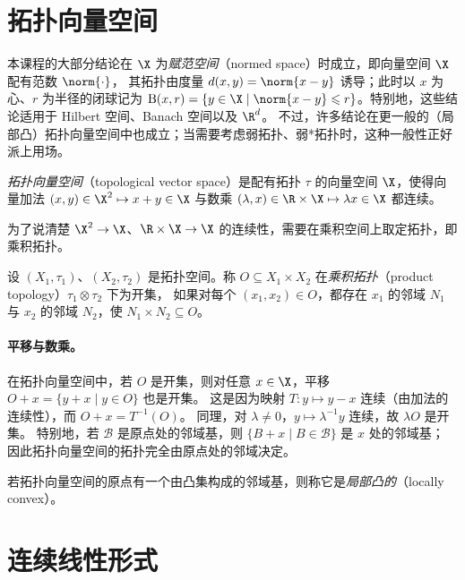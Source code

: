 \section{拓扑向量空间}

本课程的大部分结论在 $\X$ 为\emph{赋范空间}（normed space）时成立，即向量空间 $\X$ 配有范数 $\norm{\cdot}$，
其拓扑由度量 $d(x,y)=\norm{x-y}$ 诱导；此时以 $x$ 为心、$r$ 为半径的闭球记为
$\mathrm{B}(x,r)=\{y\in\X\mid\norm{x-y}\leqslant r\}$。特别地，这些结论适用于 Hilbert 空间、Banach 空间以及 $\R^d$。
不过，许多结论在更一般的（局部凸）拓扑向量空间中也成立；当需要考虑弱拓扑、弱*拓扑时，这种一般性正好派上用场。

\begin{definition}[拓扑向量空间]
\label{def:33}
\emph{拓扑向量空间}（topological vector space）是配有拓扑 $\tau$ 的向量空间 $\X$，使得向量加法
$(x,y)\in\X^2\mapsto x+y\in\X$ 与数乘 $(\lambda,x)\in\R\times\X\mapsto\lambda x\in\X$ 都连续。
\end{definition}

为了说清楚 $\X^2\to\X$、$\R\times\X\to\X$ 的连续性，需要在乘积空间上取定拓扑，即乘积拓扑。

\begin{definition}[乘积拓扑]
\label{def:34}
设 $(X_1,\tau_1)$、$(X_2,\tau_2)$ 是拓扑空间。称 $O\subseteq X_1\times X_2$ 在\emph{乘积拓扑}（product topology）$\tau_1\otimes\tau_2$ 下为开集，
如果对每个 $(x_1,x_2)\in O$，都存在 $x_1$ 的邻域 $N_1$ 与 $x_2$ 的邻域 $N_2$，使 $N_1\times N_2\subseteq O$。
\end{definition}

\paragraph{平移与数乘。}
在拓扑向量空间中，若 $O$ 是开集，则对任意 $x\in\X$，平移 $O+x=\{y+x\mid y\in O\}$ 也是开集。
这是因为映射 $T:y\mapsto y-x$ 连续（由加法的连续性），而 $O+x=T^{-1}(O)$。
同理，对 $\lambda\neq0$，$y\mapsto\lambda^{-1}y$ 连续，故 $\lambda O$ 是开集。
特别地，若 $\mathcal{B}$ 是原点处的邻域基，则 $\{B+x\mid B\in\mathcal{B}\}$ 是 $x$ 处的邻域基；
因此拓扑向量空间的拓扑完全由原点处的邻域决定。

\begin{definition}[局部凸拓扑向量空间]
\label{def:35}
若拓扑向量空间的原点有一个由凸集构成的邻域基，则称它是\emph{局部凸的}（locally convex）。
\end{definition}

\section{连续线性形式}

